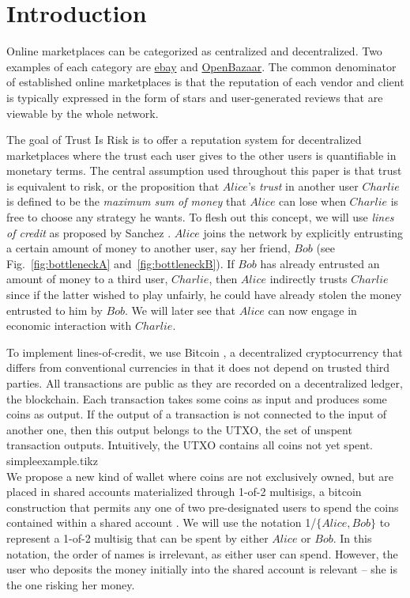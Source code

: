 \section{Introduction}
  Online marketplaces can be categorized as centralized and decentralized.
  Two examples of each category are \href{http://www.ebay.com}{ebay} and \href{https://openbazaar.org/}{OpenBazaar}.
  The common denominator of established online marketplaces is that the reputation of each vendor and client is typically
  expressed in the form of stars and user-generated reviews that are viewable by the whole network.

  The goal of Trust Is Risk is to offer a reputation system for decentralized marketplaces where the trust each user gives to
  the other users is quantifiable in monetary terms. The central assumption used throughout this paper is that trust is
  equivalent to risk, or the proposition that $Alice$'s \textit{trust} in another user $Charlie$ is defined to be the
  \textit{maximum sum of money} that $Alice$ can lose when $Charlie$ is free to choose any strategy he wants. To flesh out
  this concept, we will use \textit{lines of credit} as proposed by Sanchez \cite{loc}. $Alice$ joins the network by
  explicitly entrusting a certain amount of money to another user, say her friend, $Bob$ (see Fig.~\ref{fig:bottleneckA}
  and~\ref{fig:bottleneckB}). If $Bob$ has already entrusted an amount of money to a third user, $Charlie$, then $Alice$
  indirectly trusts $Charlie$ since if the latter wished to play unfairly, he could have already stolen the money entrusted to
  him by $Bob$. We will later see that $Alice$ can now engage in economic interaction with $Charlie$.

  To implement lines-of-credit, we use Bitcoin \cite{bitcoin}, a decentralized cryptocurrency that differs from conventional
  currencies in that it does not depend on trusted third parties. All transactions are public as they are recorded on a
  decentralized ledger, the blockchain. Each transaction takes some coins as input and produces some coins as output. If the
  output of a transaction is not connected to the input of another one, then this output belongs to the UTXO, the set of
  unspent transaction outputs. Intuitively, the UTXO contains all coins not yet spent.
  \medskip \ \\
  {simpleexample.tikz} \smallskip \ \\
  We propose a new kind of wallet where coins are not exclusively owned, but are placed in shared accounts materialized
  through 1-of-2 multisigs, a bitcoin construction that permits any one of two pre-designated users to spend the coins
  contained within a shared account \cite{masteringbitcoin}. We will use the notation 1/$\{Alice, Bob\}$ to represent a
  1-of-2 multisig that can be spent by either $Alice$ or $Bob$. In this notation, the order of names is irrelevant, as
  either user can spend. However, the user who deposits the money initially into the shared account is relevant -- she is the
  one risking her money.

